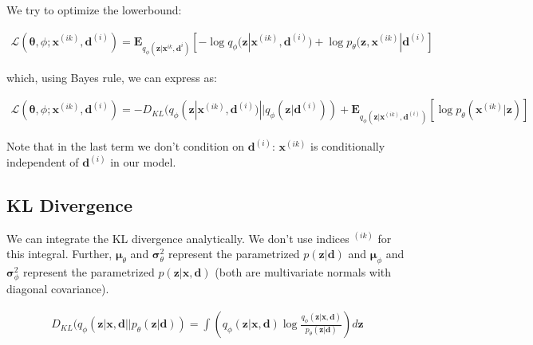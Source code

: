 \documentclass{article}
\begin{document}
We try to optimize the lowerbound: 

\begin{align}
\mathcal{L}(\mathbf{\theta}, \phi; \mathbf{x}^{(ik)}, \mathbf{d}^{(i)}) = \mathbf{E}_{q_\phi(\mathbf{z}|\mathbf{x}^{ik},\mathbf{d}^{i})}[-\log q_\phi (\mathbf{z}| \mathbf{x}^{(ik)}, \mathbf{d}^{(i)})+\log p_\theta(\mathbf{z}, \mathbf{x}^{(ik)}|\mathbf{d}^{(i)} ]
\end{align}

which, using Bayes rule, we can express as:

\begin{align}
\mathcal{L}(\mathbf{\theta}, \phi; \mathbf{x}^{(ik)}, \mathbf{d}^{(i)}) = -D_{KL}(q_\phi (\mathbf{z}| \mathbf{x}^{(ik)}, \mathbf{d}^{(i)})||q_\phi (\mathbf{z}| \mathbf{d}^{(i)})) + \mathbf{E}_{q_\phi(\mathbf{z}|\mathbf{x}^{(ik)},\mathbf{d}^{(i)})}[\log p_\theta (\mathbf{x}^{(ik)}|\mathbf{z})]
\end{align}

Note that in the last term we don't condition on $\mathbf{d}^{(i)}$: $\mathbf{x}^{(ik)}$ is conditionally independent of $\mathbf{d}^{(i)}$ in our model.

\subsection{KL Divergence}

We can integrate the KL divergence analytically. We don't use indices $^{(ik)}$ for this integral. Further, $\mathbf{\mu}_\theta$ and $\mathbf{\sigma}_\theta^2$ represent the parametrized $p(\mathbf{z}|\mathbf{d})$ and $\mathbf{\mu}_\phi$ and $\mathbf{\sigma}_\phi^2$ represent the parametrized $p(\mathbf{z}|\mathbf{x},\mathbf{d})$ (both are multivariate normals with diagonal covariance).

\begin{align}
D_{KL}(q_\phi (\mathbf{z}| \mathbf{x}, \mathbf{d}||p_\theta (\mathbf{z}| \mathbf{d})) =
\int(q_\phi (\mathbf{z}| \mathbf{x}, \mathbf{d})\log \frac{q_\phi (\mathbf{z}| \mathbf{x}, \mathbf{d})}{p_\theta (\mathbf{z}| \mathbf{d})})d\mathbf{z}
\end{align}

\end{document}
